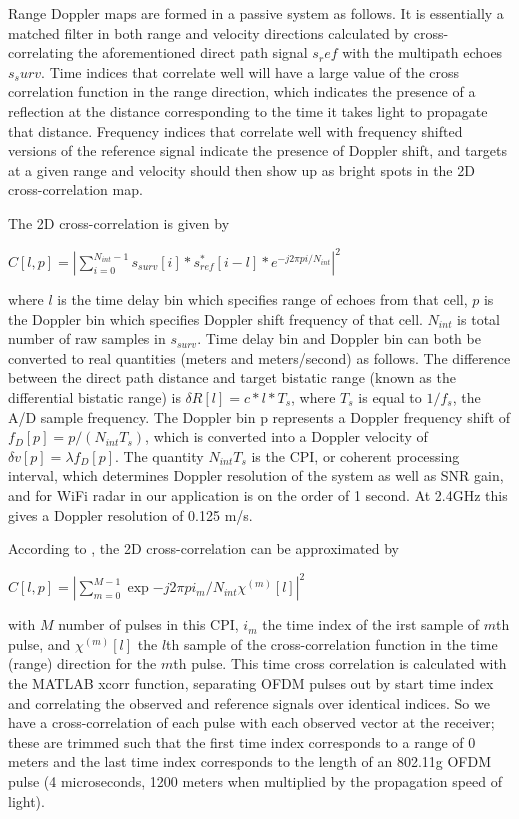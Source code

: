 \documentclass[article,11pt,onecolumn,final]{IEEEtran}
\begin{document}
Range Doppler maps are formed in a passive system as follows. It is essentially a matched filter in both range and velocity directions calculated by cross-correlating the aforementioned direct path signal $s_ref$ with the multipath echoes $s_surv$. Time indices that correlate well will have a large value of the cross correlation function in the range direction, which indicates the presence of a reflection at the distance corresponding to the time it takes light to propagate that distance. Frequency indices that correlate well with frequency shifted versions of the reference signal indicate the presence of Doppler shift, and targets at a given range and velocity should then show up as bright spots in the 2D cross-correlation map.

The 2D cross-correlation is given by

$ C[l, p] = | \sum\limits_{i=0}^{N_{int}-1} s_{surv}[i]*s_{ref}^{*}[i - l]*e^{-j2\pi pi/N_{int}}|^2 $

where $l$ is the time delay bin which specifies range of echoes from that cell, $p$ is the Doppler bin which specifies Doppler shift frequency of that cell. $N_{int}$ is total number of raw samples in $s_{surv}$. Time delay bin and Doppler bin can both be converted to real quantities (meters and meters/second) as follows. The difference between the direct path distance and target bistatic range (known as the differential bistatic range) is $\delta R[l] = c*l*T_s$, where $T_s$ is equal to $1/f_s$, the A/D sample frequency. The Doppler bin p represents a Doppler frequency shift of $f_D[p] = p/(N_{int}T_s)$, which is converted into a Doppler velocity of $\delta v[p] = \lambda f_D[p]$. The quantity $N_{int}T_s$ is the CPI, or coherent processing interval, which determines Doppler resolution of the system as well as SNR gain, and for WiFi radar in our application is on the order of 1 second. At 2.4GHz this gives a Doppler resolution of 0.125 m/s.

According to \cite{Colone2012}, the 2D cross-correlation can be approximated by

$ C[l, p] = |\sum\limits_{m=0}^{M-1}\exp{-j2\pi pi_m/N_{int}}\chi^{(m)}[l]|^2 $

with $M$ number of pulses in this CPI, $i_m$ the time index of the irst sample of $m$th pulse, and $\chi^{(m)}[l]$ the $l$th sample of the cross-correlation function in the time (range) direction for the $m$th pulse. This time cross correlation is calculated with the MATLAB xcorr function, separating OFDM pulses out by start time index and correlating the observed and reference signals over identical indices. So we have a cross-correlation of each pulse with each observed vector at the receiver; these are trimmed such that the first time index corresponds to a range of 0 meters and the last time index corresponds to the length of an 802.11g OFDM pulse (4 microseconds, 1200 meters when multiplied by the propagation speed of light).
\end{document}
